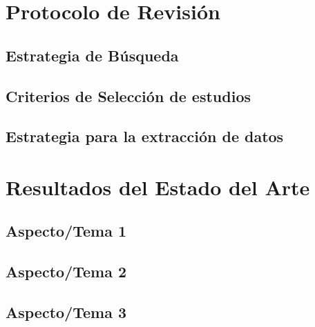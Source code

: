 \documentclass{informe_investigacion}
\begin{document}
\chapter{Protocolo de Revisión}
\section{Estrategia de Búsqueda}
\section{Criterios de Selección de estudios}
\section{Estrategia para la extracción de datos}

\chapter{Resultados del Estado del Arte}
\section{Aspecto/Tema 1}
\section{Aspecto/Tema 2}
\section{Aspecto/Tema 3}
\end{document}

